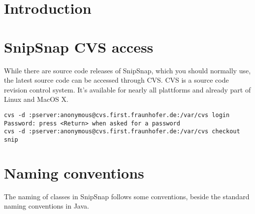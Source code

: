 \documentclass[a4paper,pdftex]{article}
\begin{document}
  
  \thispagestyle{empty}

  {\raggedleft{}
 
   }
 
  \newpage
  \pagestyle{empty}
  \tableofcontents
  \newpage
  \pagestyle{fancy}

\section{Introduction}


\section{SnipSnap CVS access}

While there are source code releases of SnipSnap, which you should normally use,
the latest source code can be accessed through CVS. CVS is a source code revision
control system\cite{CVS}. It's available for nearly all plattforms and already part of Linux and
MacOS X.

\begin{verbatim}
cvs -d :pserver:anonymous@cvs.first.fraunhofer.de:/var/cvs login
Password: press <Return> when asked for a password
cvs -d :pserver:anonymous@cvs.first.fraunhofer.de:/var/cvs checkout snip
\end{verbatim}

\section{Naming conventions}

The naming of classes in SnipSnap follows some conventions, beside the standard naming conventions
in Java.
\end{document}

